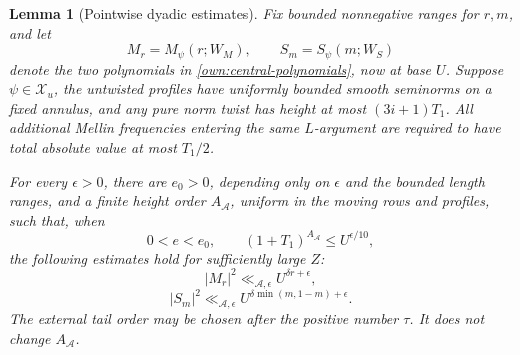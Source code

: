 \documentclass[12pt]{article}
\newtheorem{lemma}[theorem]{Lemma}
\begin{document}
\begin{lemma}[Pointwise dyadic estimates]\label{lem:detector-dyads}
Fix bounded nonnegative ranges for \(r,m\), and let
\[
 M_r=M_\psi(r;W_M),\qquad S_m=S_\psi(m;W_S)
\]
denote the two polynomials in \eqref{own:central-polynomials},
now at base \(U\).  Suppose
\(\psi\in\mathcal X_u\), the untwisted profiles have uniformly
bounded smooth seminorms on a fixed annulus, and any pure norm twist
has height at most \((3i+1)T_1\).  All additional Mellin frequencies
entering the same \(L\)-argument are required to have total absolute
value at most \(T_1/2\).

For every \(\epsilon>0\), there are \(e_0>0\), depending only on
\(\epsilon\) and the bounded length ranges, and a finite height
order \(A_{\mathcal A}\), uniform in the moving rows and profiles,
such that, when
\[
 0<e<e_0,\qquad (1+T_1)^{A_{\mathcal A}}\le U^{\epsilon/10},
\]
the following estimates hold for sufficiently large \(Z\):
\begin{equation}
 |M_r|^2\ll_{\mathcal A,\epsilon}U^{\delta r+\epsilon},
 \label{old-eq:6.2}
\end{equation}
\begin{equation}
 |S_m|^2\ll_{\mathcal A,\epsilon}
       U^{\delta\min(m,1-m)+\epsilon}.
 \label{old-eq:6.3}
\end{equation}
The external tail order may be chosen after the positive number
\(\tau\).  It does not change \(A_{\mathcal A}\).
\end{lemma}
\end{document}
